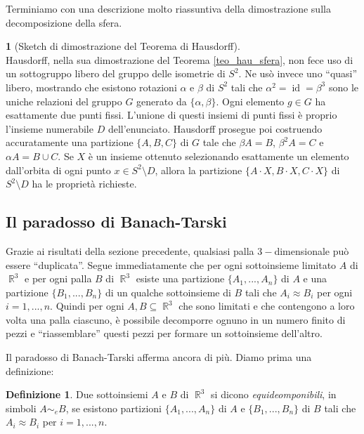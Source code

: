 \documentclass[12pt,a4paper]{report}
\theoremstyle{definition}
\newtheorem{defn}[teo]{Definizione}  %
\theoremstyle{num.custom-title}
\newtheorem{teo_custom-title}[teo]{} %
\DeclareMathOperator{\id}{id}
\DeclareMathOperator{\R}{\mathbb{R}}
\DeclareMathOperator{\sm}{\setminus}
\begin{document}
Terminiamo con una descrizione molto riassuntiva della dimostrazione sulla decomposizione della sfera.

\begin{teo_custom-title}[Sketch di dimostrazione del Teorema di Hausdorff]\ \\
Hausdorff, nella sua dimostrazione del Teorema \ref{teo_hau_sfera}, non fece uso di un sottogruppo libero del gruppo delle isometrie di $S^2$. Ne usò invece uno ``quasi'' libero, mostrando che esistono rotazioni $\alpha$ e $\beta$ di $S^2$ tali che $\alpha^2=\id=\beta^3$ sono le uniche relazioni del gruppo $G$ generato da $\{\alpha,\beta\}$. Ogni elemento $g \in G$ ha esattamente due punti fissi. L'unione di questi insiemi di punti fissi è proprio l'insieme numerabile $D$ dell'enunciato. Hausdorff prosegue poi costruendo accuratamente una partizione $\{A,B,C\}$ di $G$ tale che $\beta A = B$, $\beta^2 A = C$ e $\alpha A = B \cup C$. Se $X$ è un insieme ottenuto selezionando esattamente un elemento dall'orbita di ogni punto $x \in S^2 \sm D$, allora la partizione $\{A \cdot X, B \cdot X, C \cdot X\}$ di $S^2 \sm D$ ha le proprietà richieste.
\end{teo_custom-title}

\subsection{Il paradosso di Banach-Tarski}

Grazie ai risultati della sezione precedente, qualsiasi palla $3-$dimensionale può essere ``duplicata''. Segue immediatamente che per ogni sottoinsieme limitato $A$ di $\R^3$ e per ogni palla $B$ di $\R^3$ esiste una partizione $\{A_1,...,A_n\}$ di $A$ e una partizione $\{B_1,...,B_n\}$ di un qualche sottoinsieme di $B$ tali che $A_i \approx B_i$ per ogni $i=1,...,n$. Quindi per ogni $A,B \subseteq \R^3$ che sono limitati e che contengono a loro volta una palla ciascuno, è possibile decomporre ognuno in un numero finito di pezzi e ``riassemblare'' questi pezzi per formare un sottoinsieme dell'altro.

Il paradosso di Banach-Tarski afferma ancora di più. Diamo prima una definizione:

\begin{defn}
Due sottoinsiemi $A$ e $B$ di $\R^3$ si dicono \emph{equideomponibili}, in simboli $A \sim_e B$, se esistono partizioni $\{A_1,...,A_n\}$ di $A$ e $\{B_1,...,B_n\}$ di $B$ tali che $A_i \approx B_i$ per $i=1,...,n$.
\end{defn}
\end{document}
